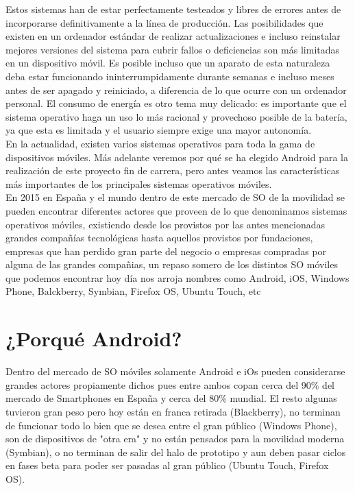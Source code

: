 \documentclass[../pfc.tex]{subfiles}
\begin{document}
	Estos sistemas han de estar perfectamente testeados y libres de errores antes de incorporarse definitivamente a la línea de producción. Las posibilidades que existen en un ordenador estándar de realizar actualizaciones e incluso reinstalar mejores versiones del sistema para cubrir fallos o deficiencias son más limitadas en un dispositivo móvil.
	Es posible incluso que un aparato de esta naturaleza deba estar funcionando ininterrumpidamente durante semanas e incluso meses antes de ser apagado y reiniciado, a diferencia de lo que ocurre con un ordenador personal. El consumo de energía es otro tema muy delicado: es importante que el sistema operativo haga un uso lo más racional y provechoso posible de la batería, ya que esta es limitada y el usuario siempre exige una mayor autonomía.\\
	
	En la actualidad, existen varios sistemas operativos para toda la gama de dispositivos móviles. Más adelante veremos por qué se ha elegido Android para la realización de este proyecto fin de carrera, pero antes veamos las características más importantes de los principales sistemas operativos móviles.\\
	
	En 2015 en España y el mundo dentro de este mercado de SO de la movilidad se pueden encontrar diferentes actores que proveen de lo que denominamos sistemas operativos móviles, existiendo desde los provistos por las antes mencionadas grandes compañías tecnológicas hasta aquellos provistos por fundaciones, empresas que han perdido gran parte del negocio o empresas compradas por alguna de las grandes compañias, un repaso somero de los distintos SO móviles que podemos encontrar hoy día nos arroja nombres como Android, iOS, Windows Phone, Balckberry, Symbian, Firefox OS, Ubuntu Touch, etc
		
	\section{¿Porqué Android?}
	Dentro del mercado de SO móviles solamente Android e iOs pueden considerarse grandes actores propiamente dichos pues entre ambos copan cerca del 90\% del mercado de Smartphones en España y cerca del 80\% mundial. El resto algunas tuvieron gran peso pero hoy están en franca retirada (Blackberry), no terminan de funcionar todo lo bien que se desea entre el gran público (Windows Phone), son de dispositivos de "otra era" y no están pensados para la movilidad moderna (Symbian), o no terminan de salir del halo de prototipo y aun deben pasar ciclos en fases beta para  poder ser pasadas al gran público (Ubuntu Touch, Firefox OS).\\
	
\end{document}
